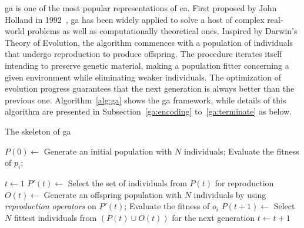 \acrfull{ga} is one of the most popular representations of \gls{ea}. First proposed by John Holland in 1992~\cite{holland1992genetic}, \gls{ga} has been widely applied to solve a host of complex real-world problems as well as computationally theoretical ones. Inspired by Darwin's Theory of Evolution, the algorithm commences with a population of individuals that undergo reproduction to produce offspring. The procedure iterates itself intending to preserve genetic material, making a population fitter concerning a given environment while eliminating weaker individuals. The optimization of evolution progress guarantees that the next generation is always better than the previous one. Algorithm~\ref{alg:ga} shows the \gls{ga} framework, while details of this algorithm are presented in Subsection~\ref{ga:encoding} to~\ref{ga:terminate} as below.

\bigskip
\begin{algorithm}
	\caption{The skeleton of \gls{ga}}
	\label{alg:ga}
	\BlankLine
	\Begin
	{	
		$P(0) \leftarrow$ Generate an initial population with $N$ individuals; \;
		{
			Evaluate the fitness of $p_i$; \;
		} 
		
		$t \leftarrow 1$\;
		{
			$P'(t) \leftarrow$ Select the set of individuals from $P(t)$ for reproduction \;
			$O(t) \leftarrow$ Generate an offspring population with $N$ individuals by using \emph{reproduction operators} on $P'(t)$; \;
			{
				Evaluate the fitness of $o_i$\;
			} 
			$P(t+1) \leftarrow$ Select $N$ fittest individuals from $(P(t) \cup O(t))$ for the next generation\;
			$t \leftarrow t + 1$\;
		}
	}
\end{algorithm}

